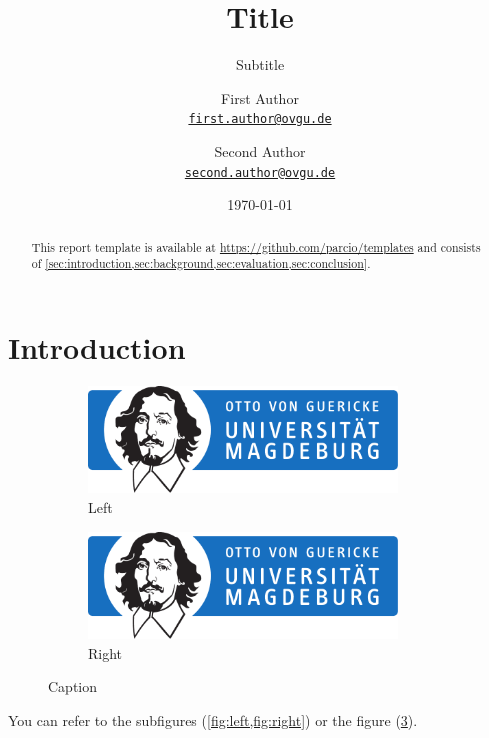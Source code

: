 \documentclass[
    12pt,
    a4paper,
    parskip=half,
]{scrartcl}
\title{Title}
\subtitle{Subtitle}
\author{
First Author\\
{\large\href{mailto:first.author@ovgu.de}{\nolinkurl{first.author@ovgu.de}}}
\and
Second Author\\
{\large\href{mailto:second.author@ovgu.de}{\nolinkurl{second.author@ovgu.de}}}
}
\date{\today}
\begin{document}
\maketitle

\begin{abstract}
\lipsum[1]

This report template is available at \url{https://github.com/parcio/templates} and consists of \cref{sec:introduction,sec:background,sec:evaluation,sec:conclusion}.
\end{abstract}

\newpage

\tableofcontents

\newpage

\section{Introduction}
\label{sec:introduction}

\begin{figure}[ht]
    \centering
    \begin{subfigure}{0.45\textwidth}
        \centering
        \includegraphics[width=0.9\textwidth]{OVGU-INF}
        \caption{Left}
        \label{fig:left}
    \end{subfigure}
    \begin{subfigure}{0.45\textwidth}
        \centering
        \includegraphics[width=0.9\textwidth]{OVGU-INF}
        \caption{Right}
        \label{fig:right}
    \end{subfigure}
    \caption{Caption}
    \label{fig:both}
\end{figure}

You can refer to the subfigures (\cref{fig:left,fig:right}) or the figure (\cref{fig:both}).
\end{document}
